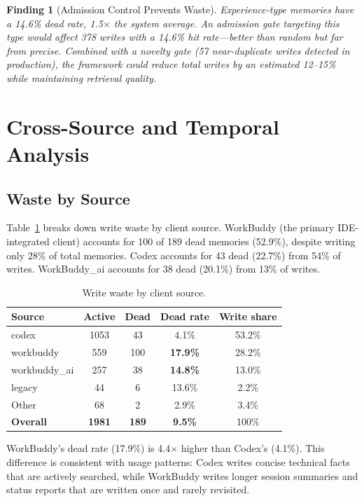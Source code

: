 \documentclass[10pt,twocolumn]{article}
\newtheorem{finding}{Finding}
\begin{document}
\begin{finding}[Admission Control Prevents Waste]
Experience-type memories have a 14.6\% dead rate, 1.5$\times$ the system average. An admission gate targeting this type would affect 378 writes with a 14.6\% hit rate---better than random but far from precise. Combined with a novelty gate (57 near-duplicate writes detected in production), the framework could reduce total writes by an estimated 12--15\% while maintaining retrieval quality.
\end{finding}

\section{Cross-Source and Temporal Analysis}

\subsection{Waste by Source}

Table~\ref{tab:source_waste} breaks down write waste by client source. WorkBuddy (the primary IDE-integrated client) accounts for 100 of 189 dead memories (52.9\%), despite writing only 28\% of total memories. Codex accounts for 43 dead (22.7\%) from 54\% of writes. WorkBuddy\_ai accounts for 38 dead (20.1\%) from 13\% of writes.

\begin{table}[h]
\centering
\caption{Write waste by client source.}
\label{tab:source_waste}
\begin{tabular}{lcccc}
\toprule
Source & Active & Dead & Dead rate & Write share \\
\midrule
codex & 1053 & 43 & 4.1\% & 53.2\% \\
workbuddy & 559 & 100 & \textbf{17.9\%} & 28.2\% \\
workbuddy\_ai & 257 & 38 & \textbf{14.8\%} & 13.0\% \\
legacy & 44 & 6 & 13.6\% & 2.2\% \\
Other & 68 & 2 & 2.9\% & 3.4\% \\
\midrule
\textbf{Overall} & \textbf{1981} & \textbf{189} & \textbf{9.5\%} & 100\% \\
\bottomrule
\end{tabular}
\end{table}

WorkBuddy's dead rate (17.9\%) is 4.4$\times$ higher than Codex's (4.1\%). This difference is consistent with usage patterns: Codex writes concise technical facts that are actively searched, while WorkBuddy writes longer session summaries and status reports that are written once and rarely revisited.
\end{document}
